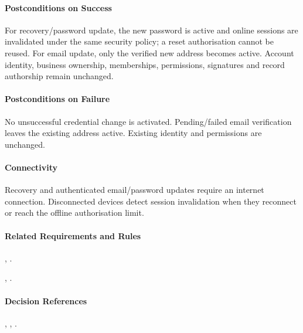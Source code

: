 \paragraph{Postconditions on Success}

For recovery/password update, the new password is active and online sessions
    are invalidated under the same security policy; a reset authorisation cannot
    be reused. For email update, only the verified new address becomes active.
    Account identity, business ownership, memberships, permissions, signatures
    and record authorship remain unchanged.

\paragraph{Postconditions on Failure}

No unsuccessful credential change is activated. Pending/failed email verification
    leaves the existing address active. Existing identity and permissions are unchanged.

\paragraph{Connectivity}

Recovery and authenticated email/password updates require an internet connection.
    Disconnected devices detect session invalidation
    when they reconnect or reach the offline
    authorisation limit.

\paragraph{Related Requirements and Rules}
\hyperref[fr:005]{}, \hyperref[fr:064]{}.

\hyperref[br:002]{}, \hyperref[br:042]{}.

\paragraph{Decision References}
, , .
